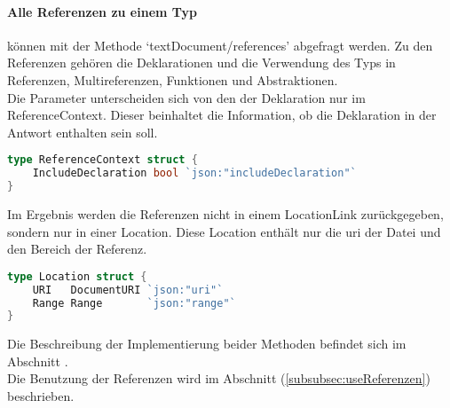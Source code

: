 \documentclass[./einleitung.tex]{subfiles}
\begin{document}
    \paragraph{Alle Referenzen zu einem Typ} können mit der Methode `textDocument/references' abgefragt werden.
    Zu den Referenzen gehören die Deklarationen und die Verwendung des Typs in Referenzen, Multireferenzen, Funktionen und Abstraktionen.\\
    Die Parameter unterscheiden sich von den der Deklaration nur im ReferenceContext.
    Dieser beinhaltet die Information, ob die Deklaration in der Antwort enthalten sein soll.
    \begin{lstlisting}[language=Go, title=Definition des ReferenceContext, label=lst:referenceContext]
type ReferenceContext struct {
	IncludeDeclaration bool `json:"includeDeclaration"`
}
    \end{lstlisting}
    Im Ergebnis werden die Referenzen nicht in einem LocationLink zurückgegeben, sondern nur in einer Location.
    Diese Location enthält nur die \acrshort{uri} der Datei und den Bereich der Referenz.
    \begin{lstlisting}[language=Go, title=Definition der Location, label=lst:location]
type Location struct {
	URI   DocumentURI `json:"uri"`
	Range Range       `json:"range"`
}
    \end{lstlisting}

    Die Beschreibung der Implementierung beider Methoden befindet sich im Abschnitt .\\
    Die Benutzung der Referenzen wird im Abschnitt  (\ref{subsubsec:useReferenzen}) beschrieben.
\end{document}
